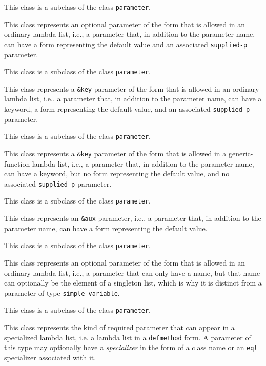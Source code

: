 This class is a subclass of the class \texttt{parameter}.


This class represents an optional parameter of the form that is
allowed in an ordinary lambda list, i.e., a parameter that, in
addition to the parameter name, can have a form representing the
default value and an associated \texttt{supplied-p} parameter.

This class is a subclass of the class \texttt{parameter}.


This class represents a \texttt{\&key} parameter of the form that is
allowed in an ordinary lambda list, i.e., a parameter that, in
addition to the parameter name, can have a keyword, a form
representing the default value, and an associated \texttt{supplied-p}
parameter.

This class is a subclass of the class \texttt{parameter}.


This class represents a \texttt{\&key} parameter of the form that is
allowed in a generic-function lambda list, i.e., a parameter that, in
addition to the parameter name, can have a keyword, but no form
representing the default value, and no associated \texttt{supplied-p}
parameter.

This class is a subclass of the class \texttt{parameter}.


This class represents an \texttt{\&aux} parameter, i.e., a parameter
that, in addition to the parameter name, can have a form representing
the default value.

This class is a subclass of the class \texttt{parameter}.


This class represents an optional parameter of the form that is
allowed in an ordinary lambda list, i.e., a parameter that can only
have a name, but that name can optionally be the element of a
singleton list, which is why it is distinct from a parameter of type
\texttt{simple-variable}.

This class is a subclass of the class \texttt{parameter}.


This class represents the kind of required parameter that can appear
in a specialized lambda list, i.e. a lambda list in a
\texttt{defmethod} form.  A parameter of this type may optionally have
a \emph{specializer} in the form of a class name or an \texttt{eql}
specializer associated with it.

